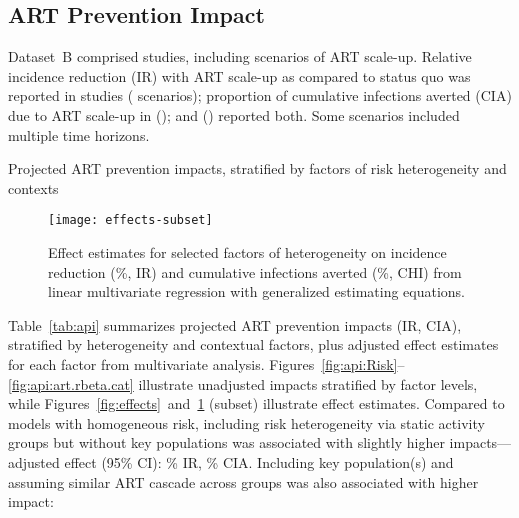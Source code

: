 \subsection{ART Prevention Impact}
\label{ss:res:api}
Dataset~B comprised  studies,
including  scenarios of ART scale-up.
Relative incidence reduction (IR) with ART scale-up as compared to status quo
was reported in  studies ( scenarios);
proportion of cumulative infections averted (CIA) due to ART scale-up
in  ();
and  () reported both.
Some scenarios included multiple time horizons.
\par
\begin{table}
  \centering
  \caption{Projected ART prevention impacts,
    stratified by factors of risk heterogeneity and contexts}
  
  \label{tab:api}
\end{table}
\begin{figure}
  \centering
  \texttt{[image: effects-subset]}
  \caption{Effect estimates for selected factors of heterogeneity on
    incidence reduction (\%, IR) and cumulative infections averted (\%, CHI)
    from linear multivariate regression with generalized estimating equations.}
  \label{fig:effects-sub}
\end{figure}
Table~\ref{tab:api} summarizes projected ART prevention impacts (IR, CIA),
stratified by heterogeneity and contextual factors,
plus adjusted effect estimates for each factor from multivariate analysis.
Figures~\ref{fig:api:Risk}--\ref{fig:api:art.rbeta.cat} illustrate
unadjusted impacts stratified by factor levels, while
Figures~\ref{fig:effects}~and~\ref{fig:effects-sub} (subset) illustrate effect estimates.
Compared to models with homogeneous risk,
including risk heterogeneity via static activity groups but without key populations
was associated with slightly higher impacts---adjusted effect (95\% CI):
\% IR, \% CIA.
Including key population(s) and assuming similar ART cascade across groups
was also associated with higher impact:
